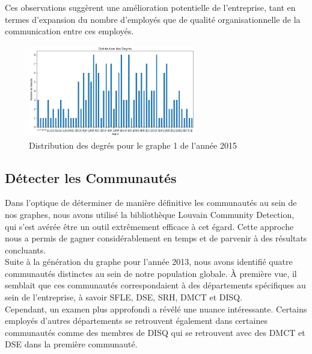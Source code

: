 \documentclass{article}
\begin{document}
Ces observations suggèrent une amélioration potentielle de l'entreprise, tant en termes d'expansion du nombre d'employés que de qualité organisationnelle de la communication entre ces employés.


\begin{figure}[!h]
    \centering
    \includegraphics[width=0.65\textwidth]{assets/communaute/distribution_deg_2015}
    \caption{Distribution des degrés pour le graphe 1 de l'année 2015}
    \label{fig:distribution_deg_2015}
\end{figure}

\subsection{Détecter les Communautés}

Dans l'optique de déterminer de manière définitive les communautés au sein de nos graphes, nous avons utilisé la bibliothèque Louvain Community Detection, qui s'est avérée être un outil extrêmement efficace à cet égard. Cette approche nous a permis de gagner considérablement en temps et de parvenir à des résultats concluants. \\

Suite à la génération du graphe pour l'année 2013, nous avons identifié quatre communautés distinctes au sein de notre population globale. À première vue, il semblait que ces communautés correspondaient à des départements spécifiques au sein de l'entreprise, à savoir SFLE, DSE, SRH, DMCT et DISQ. \\

Cependant, un examen plus approfondi a révélé une nuance intéressante. Certains employés d'autres départements se retrouvent également dans certaines communautés comme des membres de DISQ qui se retrouvent avec des DMCT et DSE dans la première communauté.
\end{document}
